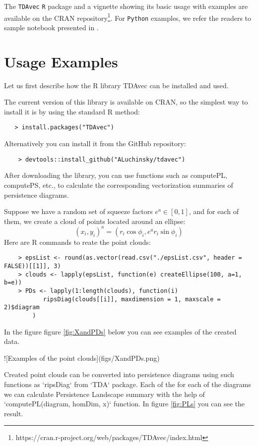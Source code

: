 \documentclass{article}
\begin{document}
The \texttt{TDAvec} \texttt{R} package and a vignette showing its basic usage with examples are available on the CRAN repository\footnote{https://cran.r-project.org/web/packages/TDAvec/index.html}. For \texttt{Python} examples, we refer the readers to sample notebook presented in \cite{pyTDAvec:2024}. 



\section{Usage Examples}

Let us first describe how the R library TDAvec can be installed and used.

The current version of this library is available on CRAN, so the simplest way to install it is by using the standard R method:

\begin{verbatim}
   > install.packages("TDAvec") 
\end{verbatim}

Alternatively you can install it from the GitHub repository:

\begin{verbatim}
    > devtools::install_github("ALuchinsky/tdavec")
\end{verbatim}

After downloading the library, you can use functions such as computePL, computePS, etc., to calculate the corresponding vectorization summaries of persistence diagrams.

Suppose we have a random set of squeeze factors $e^a \in [0,1]$, and for each of them, we create a cloud of points located around an ellipse:
$$
(x_i, y_i)^a = ( r_i \cos\phi_i, e^a r_i\sin\phi_i)
$$
Here are R commands to reate the point clouds:
\begin{verbatim}
    > epsList <- round(as.vector(read.csv("./epsList.csv", header = FALSE))[[1]], 3)
    > clouds <- lapply(epsList, function(e) createEllipse(100, a=1, b=e))
    > PDs <- lapply(1:length(clouds), function(i) 
           ripsDiag(clouds[[i]], maxdimension = 1, maxscale = 2)$diagram
        )
\end{verbatim}
In the figure figure \ref{fig:XandPDs} below you can see examples of the created data.

![Examples of the point clouds\label{fig:XandPDs}](figs/XandPDs.png)

Created point clouds can be converted into persistence diagrams using such functions as `ripsDiag` from `TDA` package. Each of the for each of the diagrams we can calculate Persistence Landscape summary with the help of `computePL(diagram, homDim, x)` function. In figure \ref{fig:PLs} you can see the result.
\end{document}

